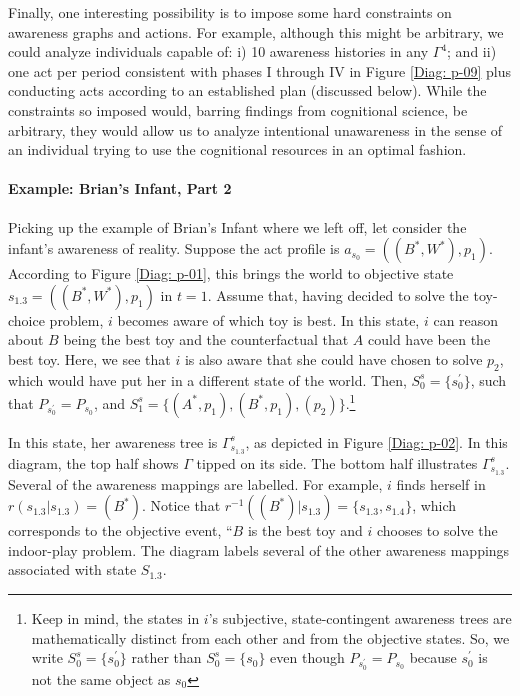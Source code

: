 \documentclass[
11pt,
titlepage,
reqno,
]{article}%
\theoremstyle{definition}
\begin{document}
Finally, one interesting possibility is to impose some hard constraints on awareness graphs and actions. 
For example, although this might be arbitrary, we could analyze individuals capable of: i) 10 awareness histories in any $\Gamma^4$; and ii) one act per period consistent with phases I through IV  in Figure \ref{Diag: p-09} plus conducting acts according to an established plan (discussed below).
While the constraints so imposed would, barring findings from cognitional science, be arbitrary, they would allow us to analyze intentional unawareness in the sense of an individual  trying to use the cognitional resources in an optimal fashion.
	
\paragraph{Example: Brian's Infant, Part 2}	
Picking up the example of Brian's Infant where we left off, let consider the infant's awareness of reality.
Suppose the act profile is $a_{s_0}=((B^\ast,W^\ast),p_1)$.
According to Figure \ref{Diag: p-01}, this brings the world to objective state $s_{1.3}=((B^\ast,W^\ast),p_1)$ in  $t=1$.
Assume that, having decided to solve the toy-choice problem, $i$ becomes aware of which toy is best.
In this state, $i$ can reason about $B$ being the best toy and the counterfactual that $A$ could have been the best toy.
Here, we see that $i$ is also aware that she could have chosen to solve $p_2$, which would have put her in a different state of the world. 
Then, $S^s_0=\{s^\prime_0\}$, such that $P_{s^\prime_0}=P_{s_0}$, and  $S^s_1=\{(A^\ast,p_1),(B^\ast,p_1),(p_2)\}$.\footnote
{
	Keep in mind, the states in $i$'s subjective, state-contingent awareness trees are mathematically distinct from each other and from the objective states. So, we write  $S^s_0=\{s^\prime_0\}$ rather than $S^s_0=\{s_0\}$ even though $P_{s^\prime_0}=P_{s_0}$ because $s^\prime_0$ is not the same object as $s_0$
}

In this state, her awareness tree is $\Gamma^s_{s_{1.3}}$, as depicted in Figure \ref{Diag: p-02}.
In this diagram, the top half shows $\Gamma$ tipped on its side. 
The bottom half illustrates $\Gamma^s_{s_{1.3}}$.
Several of the awareness mappings are labelled.
For example, $i$ finds herself in $r(s_{1.3}|s_{1.3})=(B^\ast)$.
Notice that $r^{-1}((B^\ast)|s_{1.3})=\{s_{1.3},s_{1.4}\}$, which corresponds to the objective event, ``$B$ is the best toy and $i$ chooses to solve the indoor-play problem.
The diagram labels several of the other awareness mappings associated with state $S_{1.3}$.
\end{document}

